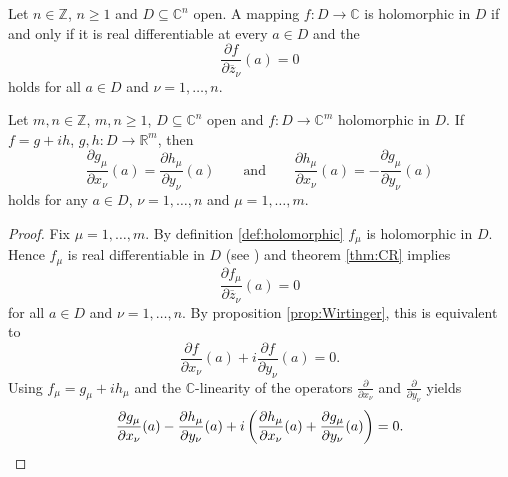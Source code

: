 \begin{appendix}
\begin{theorem}
Let $n \in \mathbb{Z}$, $n \geq 1$ and $D \subseteq \mathbb{C}^n$ open. A mapping $f: D \to \mathbb{C}$ is holomorphic in $D$ if and only if it is real differentiable at every $a \in D$ and the 
\begin{equation}
\frac{\partial f}{\partial \overline{z}_\nu}(a) = 0 
\end{equation}
\noindent holds for all $a \in D$ and $\nu = 1,\dots,n$.
\label{thm:CR}
\end{theorem}

\begin{corollary}
Let $m,n \in \mathbb{Z}$, $m,n \geq 1$, $D \subseteq \mathbb{C}^n$ open and $f: D \to \mathbb{C}^m$ holomorphic in $D$. If $f = g + ih$, $g,h : D \to \mathbb{R}^m$, then 
\begin{equation}
\boxed{\frac{\partial g_\mu}{\partial x_\nu}(a) = \frac{\partial h_\mu}{\partial y_\nu}(a) \qquad \text{and} \qquad \frac{\partial h_\mu}{\partial x_\nu}(a) = -\frac{\partial g_\mu}{\partial y_\nu}(a)}
\end{equation} 
\noindent holds for any $a \in D$, $\nu = 1,\dots,n$ and $\mu = 1,\dots,m$.
\label{cor:CRreal}
\end{corollary}

\begin{proof}
Fix $\mu = 1,\dots,m$. By definition \ref{def:holomorphic} $f_\mu$ is holomorphic in $D$. Hence $f_\mu$ is real differentiable in $D$ (see \cite[27]{grauert:complex_manifolds:2010}) and theorem \ref{thm:CR} implies
\begin{equation*}
\frac{\partial f_\mu}{\partial \overline{z}_\nu}(a) = 0
\end{equation*}
\noindent for all $a \in D$ and $\nu = 1,\dots,n$. By proposition \ref{prop:Wirtinger}, this is equivalent to 
\begin{equation*}
\frac{\partial f}{\partial x_\nu}(a) + i \frac{\partial f}{\partial y_\nu}(a) = 0.
\end{equation*}
Using $f_\mu = g_\mu + i h_\mu$ and the $\mathbb{C}$-linearity of the operators $\frac{\partial}{\partial x_\nu}$ and $\frac{\partial}{\partial y_\nu}$ yields
\begin{equation*}
\frac{\partial g_\mu}{\partial x_\nu}(a) - \frac{\partial h_\mu}{\partial y_\nu}(a) + i \del[3]{ \frac{\partial h_\mu}{\partial x_\nu}(a) + \frac{\partial g_\mu}{\partial y_\nu}(a)} = 0.
\end{equation*}
\end{proof}

\end{appendix}
